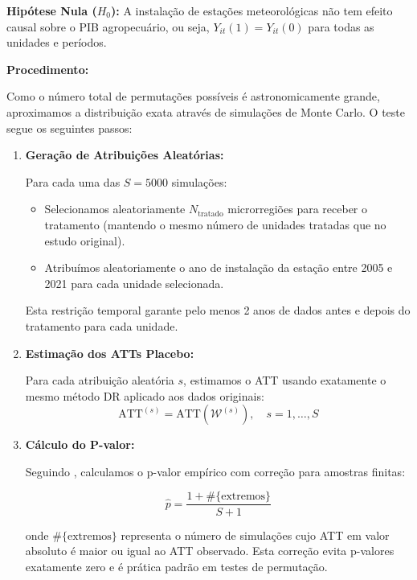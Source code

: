 \documentclass[
	12pt,				%
	oneside,			%
	a4paper,			%
	english,			%
	french,				%
	spanish,			%
	brazil				%
	]{abntex2}
\begin{document}
\textbf{Hipótese Nula ($H_0$):} A instalação de estações meteorológicas não tem efeito causal sobre o PIB agropecuário, ou seja, $Y_{it}(1) = Y_{it}(0)$ para todas as unidades e períodos.

\textbf{Procedimento:}

Como o número total de permutações possíveis é astronomicamente grande, aproximamos a distribuição exata através de simulações de Monte Carlo. O teste segue os seguintes passos:

\begin{enumerate}
\item \textbf{Geração de Atribuições Aleatórias:}
   
   Para cada uma das $S = 5000$ simulações:
   \begin{itemize}
   \item Selecionamos aleatoriamente $N_{\text{tratado}}$ microrregiões para receber o tratamento (mantendo o mesmo número de unidades tratadas que no estudo original).
   \item Atribuímos aleatoriamente o ano de instalação da estação entre 2005 e 2021 para cada unidade selecionada.
   \end{itemize}
   
   Esta restrição temporal garante pelo menos 2 anos de dados antes e depois do tratamento para cada unidade.

\item \textbf{Estimação dos ATTs Placebo:}
   
   Para cada atribuição aleatória $s$, estimamos o ATT usando exatamente o mesmo método DR aplicado aos dados originais:
   \begin{equation}
   \text{ATT}^{(s)} = \text{ATT}(\mathcal{W}^{(s)}), \quad s = 1, \ldots, S
   \end{equation}

\item \textbf{Cálculo do P-valor:}
   
   Seguindo \cite{davison1997}, calculamos o p-valor empírico com correção para amostras finitas:
   
   \begin{equation}
   \hat{p} = \frac{1 + \#\{\text{extremos}\}}{S + 1}
   \end{equation}
   
   onde $\#\{\text{extremos}\}$ representa o número de simulações cujo ATT em valor absoluto é maior ou igual ao ATT observado. Esta correção evita p-valores exatamente zero e é prática padrão em testes de permutação.
\end{enumerate}
\end{document}
